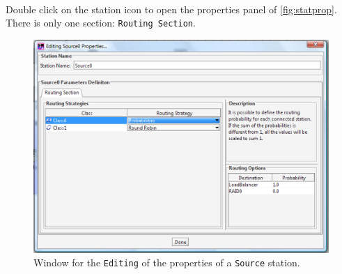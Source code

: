 \\ Double
click on the station icon to open the properties panel of
\autoref{fig:statprop}. There is only one section:
\texttt{Routing Section}.\\
\begin{figure}[htb]
    \begin{center}
        \includegraphics[scale=.5]{img/jsimg/8.5.eps}
    \end{center}
    \caption{Window for the \texttt{Editing} of the properties of a
    \texttt{Source} station.}
    \label{fig:statprop}
\end{figure}


